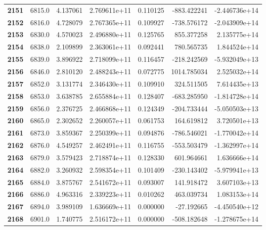 \documentclass{report}[12pt]
\begin{document}
\begin{center}
\begin{tabular}{lrrrrrr}
\textbf{2151} &         6815.0 &   4.137061 &  2.769611e+11 &    0.110125 &  -883.422241 & -2.446736e+14 \\
\textbf{2152} &         6816.0 &   4.728079 &  2.767365e+11 &    0.109927 &  -738.576172 & -2.043909e+14 \\
\textbf{2153} &         6830.0 &   4.570023 &  2.496880e+11 &    0.125765 &   855.377258 &  2.135775e+14 \\
\textbf{2154} &         6838.0 &   2.109899 &  2.363061e+11 &    0.092441 &   780.565735 &  1.844524e+14 \\
\textbf{2155} &         6839.0 &   3.896922 &  2.718099e+11 &    0.116457 &  -218.242569 & -5.932049e+13 \\
\textbf{2156} &         6846.0 &   2.810120 &  2.488243e+11 &    0.072775 &  1014.785034 &  2.525032e+14 \\
\textbf{2157} &         6852.0 &   3.131774 &  2.346430e+11 &    0.109910 &   324.511505 &  7.614435e+13 \\
\textbf{2158} &         6853.0 &   3.638785 &  2.655884e+11 &    0.128407 &  -683.285950 & -1.814728e+14 \\
\textbf{2159} &         6856.0 &   2.376725 &  2.466868e+11 &    0.124349 &  -204.733444 & -5.050503e+13 \\
\textbf{2160} &         6865.0 &   2.302652 &  2.260057e+11 &    0.061753 &   164.619812 &  3.720501e+13 \\
\textbf{2161} &         6873.0 &   3.859367 &  2.250399e+11 &    0.094876 &  -786.546021 & -1.770042e+14 \\
\textbf{2162} &         6876.0 &   4.549257 &  2.462491e+11 &    0.116755 &  -553.503479 & -1.362997e+14 \\
\textbf{2163} &         6879.0 &   3.579423 &  2.718874e+11 &    0.128330 &   601.964661 &  1.636666e+14 \\
\textbf{2164} &         6882.0 &   3.260932 &  2.598354e+11 &    0.101409 &  -230.143402 & -5.979941e+13 \\
\textbf{2165} &         6884.0 &   3.875767 &  2.541672e+11 &    0.093007 &   141.918472 &  3.607103e+13 \\
\textbf{2166} &         6886.0 &   4.963316 &  2.339223e+11 &    0.010262 &   463.039734 &  1.083153e+14 \\
\textbf{2167} &         6894.0 &   3.989109 &  1.636669e+11 &    0.000000 &   -27.192665 & -4.450540e+12 \\
\textbf{2168} &         6901.0 &   1.740775 &  2.516172e+11 &    0.000000 &  -508.182648 & -1.278675e+14 \\

\end{tabular}
\end{center}
\end{document}
